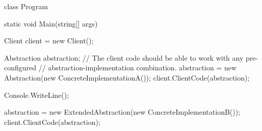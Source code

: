 {    class Program
    {
        static void Main(string[] args)
        {
            Client client = new Client();

            Abstraction abstraction;
            // The client code should be able to work with any pre-configured
            // abstraction-implementation combination.
            abstraction = new Abstraction(new ConcreteImplementationA());
            client.ClientCode(abstraction);
            
            Console.WriteLine();
            
            abstraction = new ExtendedAbstraction(new ConcreteImplementationB());
            client.ClientCode(abstraction);
        }
    }
}